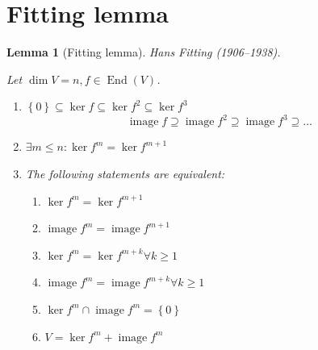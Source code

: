 \documentclass{article}
\newtheorem{lemma}{Lemma}  \numberwithin{lemma}{section}
\newcommand{\set}[1]{\left\{#1\right\}}
\DeclareMathOperator{\im}{image}
\begin{document}
\section{Fitting lemma}

\begin{lemma}[Fitting lemma]
  Hans Fitting (1906--1938).

  Let $\dim{V} = n, f \in \operatorname{End}(V)$.
  \begin{enumerate}
    \item $\set{0} \subseteq \ker{f} \subseteq \ker{f^2} \subseteq \ker{f^3}$
      \[ \im{f} \supseteq \im{f^2} \supseteq \im{f^3} \supseteq \dots \]
    \item $\exists m \leq n: \ker{f^m} = \ker{f^{m+1}}$
    \item The following statements are equivalent:
      \begin{enumerate}
        \item $\ker{f^m} = \ker{f^{m+1}}$
        \item $\im{f^m} = \im{f^{m+1}}$
        \item $\ker{f^m} = \ker{f^{m+k}} \forall k \geq 1$
        \item $\im{f^m} = \im{f^{m+k}} \forall k \geq 1$
        \item $\ker{f^m} \cap \im{f^m} = \set{0}$
        \item $V = \ker{f^m} + \im{f^m}$
      \end{enumerate}
  \end{enumerate}
\end{lemma}
\end{document}
